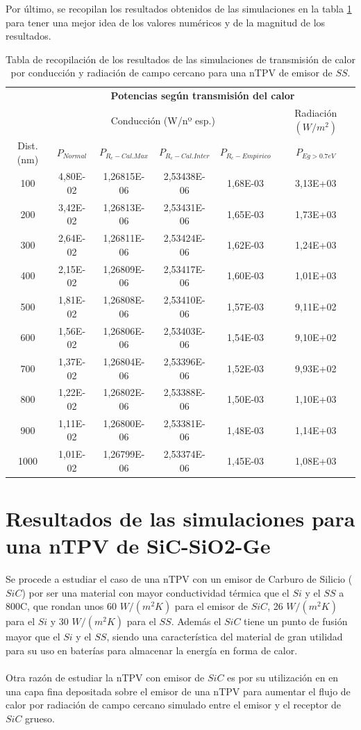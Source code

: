 Por último, se recopilan los resultados obtenidos de las simulaciones en la tabla \ref{tab:SsSiO2Ge} para tener una mejor idea de los valores numéricos y de la magnitud de los resultados.
\begin{table}[H]
	\centering
		\begin{tabular}{|c||c|c|c|c||c|}
		\hline
		\multirow{2}{*}{ }& \multicolumn{5}{c|}{\textbf{\large Potencias según transmisión del calor}}\\ \cline{2-6}
& \multicolumn{4}{c||}{Conducción (W/nº esp.)}& Radiación $(W/m^2)$\\ \hline
Dist. (nm)&$P_{Normal}$&$P_{R_c-Cal.Max}$&$P_{R_c-Cal.Inter}$&$P_{R_c-Empirico}$&$P_{Eg>0.7eV}$\\ \hline \hline
100&4,80E-02&1,26815E-06&2,53438E-06&1,68E-03&3,13E+03\\ \hline 
200&3,42E-02&1,26813E-06&2,53431E-06&1,65E-03&1,73E+03\\ \hline 
300&2,64E-02&1,26811E-06&2,53424E-06&1,62E-03&1,24E+03\\ \hline 
400&2,15E-02&1,26809E-06&2,53417E-06&1,60E-03&1,01E+03\\ \hline 
500&1,81E-02&1,26808E-06&2,53410E-06&1,57E-03&9,11E+02\\ \hline 
600&1,56E-02&1,26806E-06&2,53403E-06&1,54E-03&9,10E+02\\ \hline 
700&1,37E-02&1,26804E-06&2,53396E-06&1,52E-03&9,93E+02\\ \hline 
800&1,22E-02&1,26802E-06&2,53388E-06&1,50E-03&1,10E+03\\ \hline 
900&1,11E-02&1,26800E-06&2,53381E-06&1,48E-03&1,14E+03\\ \hline 
1000&1,01E-02&1,26799E-06&2,53374E-06&1,45E-03&1,08E+03\\ \hline 
		\end{tabular}
	\caption{Tabla de recopilación de los resultados de las simulaciones de transmisión de calor por conducción y radiación de campo cercano para una nTPV de emisor de $SS$.}
	\label{tab:SsSiO2Ge}
\end{table}
\vfill \newpage
\section{Resultados de las simulaciones para una nTPV de SiC-SiO2-Ge}\label{sec:res_SiCSiO2Ge}
Se procede a estudiar el caso de una nTPV con un emisor de Carburo de Silicio ($SiC$) por ser una material con mayor conductividad térmica que el $Si$ y el $SS$ a 800\textdegree C, que rondan unos 60 $W/(m^2 K)$ para el emisor de $SiC$, 26 $W/(m^2 K)$ para el $Si$ y 30 $W/(m^2 K)$ para el $SS$. Además el $SiC$ tiene un punto de fusión mayor que el $Si$ y el $SS$, siendo una característica del material de gran utilidad para su uso en baterías para almacenar la energía en forma de calor.\\\\
Otra razón de estudiar la nTPV con emisor de $SiC$ es por su utilización en \cite{doi:Near_field_ThinFilm} en una capa fina depositada sobre el emisor de una nTPV para aumentar el flujo de calor por radiación de campo cercano simulado entre el emisor y el receptor de $SiC$ grueso.
